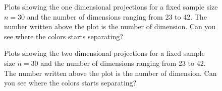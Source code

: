 \documentclass[12]{report}
\begin{document}

\begin{figure}[hbtp]
   \centering
       \caption{Plots showing the one dimensional projections for a fixed sample size $n=30$ and the number of dimensions ranging from 23 to 42. The number written above the plot is the number of dimension. Can you see where the colors starts separating?  }
       \label{conf_int}
\end{figure}

\begin{figure}[hbtp]
   \centering
       \caption{Plots showing the two dimensional projections for a fixed sample size $n=30$ and the number of dimensions ranging from 23 to 42. The number written above the plot is the number of dimension. Can you see where the colors starts separating?  }
       \label{conf_int1}
\end{figure}
\end{document}
